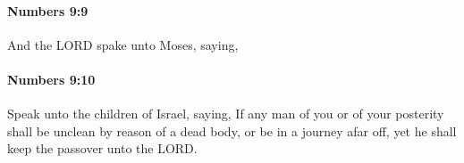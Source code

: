 		\paragraph{Numbers 9:9} %
			\label{NUMBERS-9-9}

			And the LORD spake unto Moses, saying,


		\paragraph{Numbers 9:10} %
			\label{NUMBERS-9-10}

			Speak unto the children of Israel, saying, If any man of you or of your posterity shall be unclean by reason of a dead body, or be in a journey afar off, yet he shall keep the passover unto the LORD.


